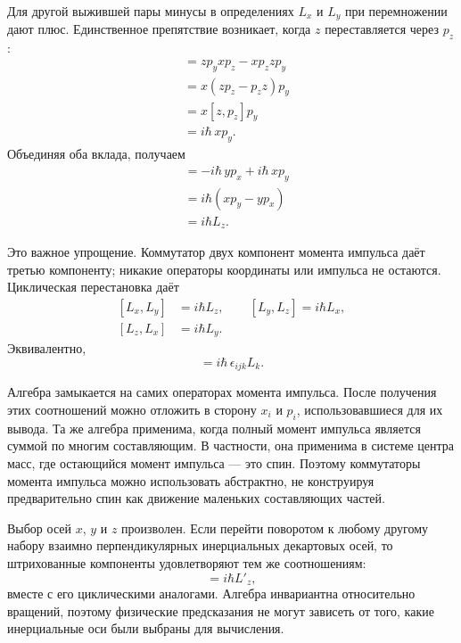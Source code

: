 Для другой выжившей пары минусы в определениях \(L_x\) и \(L_y\) при перемножении дают плюс. Единственное препятствие возникает, когда \(z\) переставляется через \(p_z\): \begin{align}
[zp_y,xp_z]
&=zp_yxp_z-xp_zzp_y \\
&=x(zp_z-p_zz)p_y \\
&=x[z,p_z]p_y \\
&=i\hbar\,xp_y.
\end{align} Объединяя оба вклада, получаем \begin{align}
[L_x,L_y]
&=-i\hbar\,yp_x+i\hbar\,xp_y \\
&=i\hbar(xp_y-yp_x) \\
&=i\hbar L_z.
\end{align}

Это важное упрощение. Коммутатор двух компонент момента импульса даёт третью компоненту; никакие операторы координаты или импульса не остаются. Циклическая перестановка даёт \begin{equation}
\begin{aligned}
[L_x,L_y]&=i\hbar L_z,\qquad
[L_y,L_z]=i\hbar L_x,\\
[L_z,L_x]&=i\hbar L_y.
\end{aligned}
\end{equation} Эквивалентно, \begin{equation}
[L_i,L_j]=i\hbar\,\epsilon_{ijk}L_k.
\end{equation}

Алгебра замыкается на самих операторах момента импульса. После получения этих соотношений можно отложить в сторону \(x_i\) и \(p_i\), использовавшиеся для их вывода. Та же алгебра применима, когда полный момент импульса является суммой по многим составляющим. В частности, она применима в системе центра масс, где остающийся момент импульса — это спин. Поэтому коммутаторы момента импульса можно использовать абстрактно, не конструируя предварительно спин как движение маленьких составляющих частей.

Выбор осей \(x\), \(y\) и \(z\) произволен. Если перейти поворотом к любому другому набору взаимно перпендикулярных инерциальных декартовых осей, то штрихованные компоненты удовлетворяют тем же соотношениям: \begin{equation}
[L'_x,L'_y]=i\hbar L'_z,
\end{equation} вместе с его циклическими аналогами. Алгебра инвариантна относительно вращений, поэтому физические предсказания не могут зависеть от того, какие инерциальные оси были выбраны для вычисления.


